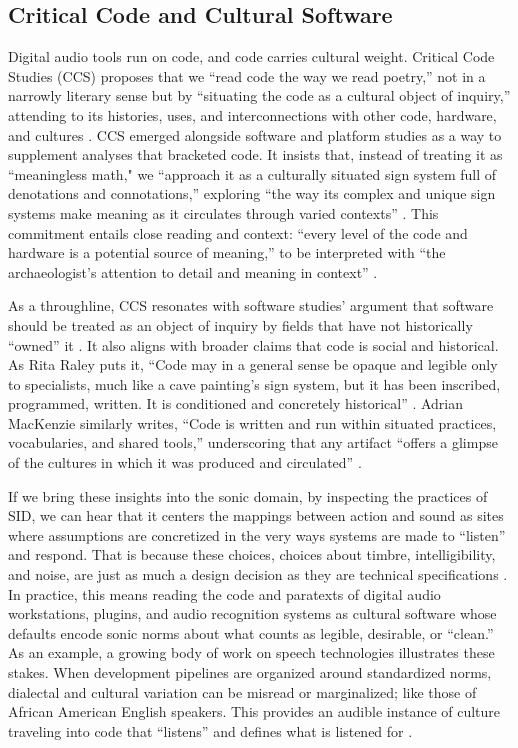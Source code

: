 \subsection{Critical Code and Cultural Software}
Digital audio tools run on code, and code carries cultural weight. Critical Code Studies (CCS) proposes that we “read code the way we read poetry,” not in a narrowly literary sense but by “situating the code as a cultural object of inquiry,” attending to its histories, uses, and interconnections with other code, hardware, and cultures \parencite[p.~31]{Marino_2020}. CCS emerged alongside software and platform studies as a way to supplement analyses that bracketed code. It insists that, instead of treating it as “meaningless math," we “approach it as a culturally situated sign system full of denotations and connotations,” exploring “the way its complex and unique sign systems make meaning as it circulates through varied contexts” \parencite[pp.19-33]{Marino_2020}. This commitment entails close reading and context: “every level of the code and hardware is a potential source of meaning,” to be interpreted with “the archaeologist’s attention to detail and meaning in context” \parencite[pp.32-48]{Marino_2020}.

As a throughline, CCS resonates with software studies’ argument that software should be treated as an object of inquiry by fields that have not historically “owned” it \parencite{Fuller_2008}. It also aligns with broader claims that code is social and historical. As Rita Raley puts it, “Code may in a general sense be opaque and legible only to specialists, much like a cave painting’s sign system, but it has been inscribed, programmed, written. It is conditioned and concretely historical” \parencite[as cited in][p.~41]{Marino_2020}. Adrian MacKenzie similarly writes, “Code is written and run within situated practices, vocabularies, and shared tools,” underscoring that any artifact “offers a glimpse of the cultures in which it was produced and circulated” \parencite[as cited in][pp.~41–42]{Marino_2020}. 

If we bring these insights into the sonic domain, by inspecting the practices of SID, we can hear that it centers the mappings between action and sound as sites where assumptions are concretized in the very ways systems are made to “listen” and respond. That is because these choices, choices about timbre, intelligibility, and noise, are just as much a design decision as they are technical specifications \parencite{Franinovic_Serafin_2013}. In practice, this means reading the code and paratexts of digital audio workstations, plugins, and audio recognition systems as cultural software whose defaults encode sonic norms about what counts as legible, desirable, or “clean.” As an example, a growing body of work on speech technologies illustrates these stakes. When development pipelines are organized around standardized norms, dialectal and cultural variation can be misread or marginalized; like those of African American English speakers. This provides an audible instance of culture traveling into code that “listens” and defines what is listened for \parencite{Cunningham_etAl_2025}.

